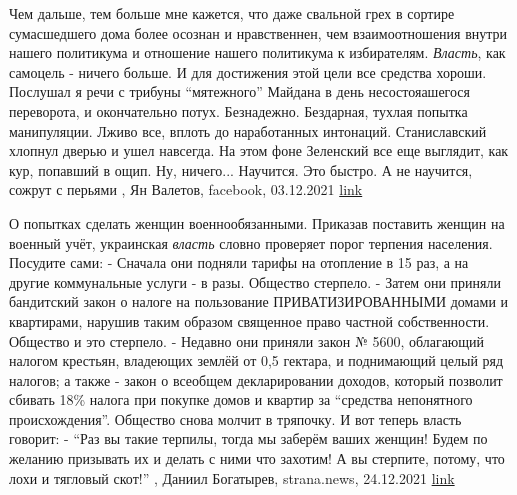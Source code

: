Чем дальше, тем больше мне кажется, что даже свальной грех в сортире
сумасшедшего дома более осознан и нравственнен, чем взаимоотношения внутри
нашего политикума и отношение нашего политикума к избирателям.  \emph{Власть}, как
самоцель - ничего больше. И для достижения этой цели все средства хороши.
Послушал я речи с трибуны \enquote{мятежного} Майдана в день несостояашегося
переворота, и окончательно потух. Безнадежно. Бездарная, тухлая попытка
манипуляции. Лживо все, вплоть до наработанных интонаций. Станиславский хлопнул
дверью и ушел навсегда.  На этом фоне Зеленский все еще выглядит, как кур,
попавший в ощип. Ну, ничего... Научится. Это быстро. А не научится, сожрут с
перьями
, Ян Валетов, facebook, 03.12.2021
\href{https://www.facebook.com/ian.valietov/posts/4655017341200725}{link}

О попытках сделать женщин военнообязанными.  Приказав поставить женщин на
военный учёт, украинская \emph{власть} словно проверяет порог терпения населения.
Посудите сами: - Сначала они подняли тарифы на отопление в 15 раз, а на другие
коммунальные услуги - в разы. Общество стерпело.  - Затем они приняли
бандитский закон о налоге на пользование ПРИВАТИЗИРОВАННЫМИ домами и
квартирами, нарушив таким образом священное право частной собственности.
Общество и это стерпело. - Недавно они приняли закон № 5600, облагающий
налогом крестьян, владеющих землёй от 0,5 гектара, и поднимающий целый ряд
налогов; а также - закон о всеобщем декларировании доходов, который позволит
сбивать 18\% налога при покупке домов и квартир за \enquote{средства
непонятного происхождения}. Общество снова молчит в тряпочку.  И вот теперь
власть говорит: - \enquote{Раз вы такие терпилы, тогда мы заберём ваших женщин!
Будем по желанию призывать их и делать с ними что захотим! А вы стерпите,
потому, что лохи и тягловый скот!}
, 
Даниил Богатырев, strana.news, 24.12.2021
\href{https://strana.news/opinions/368610-ukrainskaja-vlast-slovno-nashchupyvaet-poroh-terpenija-naselenija.html}{link}
